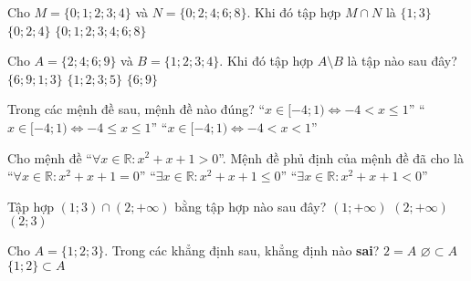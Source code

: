 \begin{ex}%
	Cho $M=\lbrace 0;1;2;3;4 \rbrace$ và $N= \lbrace 0;2;4;6;8 \rbrace$. Khi đó tập hợp $M \cap N$ là
	{$\lbrace 1;3  \rbrace$}
	{\True $ \lbrace 0;2;4  \rbrace$}
	{$\lbrace  0;1;2;3;4;6;8 \rbrace $}
\end{ex}

\begin{ex}%
	Cho $A= \lbrace 2;4;6;9 \rbrace$ và $B= \lbrace 1;2;3;4 \rbrace$. Khi đó tập hợp $A \setminus B$ là tập nào sau đây?
	\choice{$\varnothing $}
	{$ \lbrace 6;9;1;3 \rbrace $}
	{$\lbrace 1;2;3;5 \rbrace $}
	{\True $\lbrace 6;9 \rbrace $}
\end{ex}

\begin{ex}%
	Trong các mệnh đề sau, mệnh đề nào đúng?
	\choice{\True ``$x\in [-4;1)\Leftrightarrow -4 \le x <1$''}
	{``$x\in [-4;1)\Leftrightarrow -4 < x \le 1 $''}
	{``$x\in [-4;1)\Leftrightarrow -4 \le x \le 1$''}
	{``$x\in [-4;1)\Leftrightarrow -4 < x <1$''}
	\loigiai{ Ta có ``$x\in [-4;1)\Leftrightarrow -4 \le x <1$''.
	}
\end{ex}

\begin{ex}%
	Cho mệnh đề ``$\forall x \in \mathbb{R} : x^2+x+1>0$''. Mệnh đề phủ định của mệnh đề đã cho là
	{``$\forall x \in \mathbb{R} :x^2+x+1 = 0$''}
	{\True ``$\exists x \in \mathbb{R} :x^2+x+1 \le 0$''}
	{``$\exists x \in \mathbb{R} :x^2+x+1 < 0$''}
\end{ex}
\begin{ex}%
	Tập hợp $(1;3) \cap (2;+\infty )$ bằng tập hợp nào sau đây?
	\choice{$\varnothing $}
	{$(1;+\infty) $}
	{$(2;+\infty ) $}
	{\True $(2;3) $}
\end{ex}
\begin{ex}%
	Cho $A= \lbrace 1;2;3 \rbrace$. Trong các khẳng định sau, khẳng định nào {\bf sai}?
	{\True $2=A $}
	{$\varnothing \subset A $}
	{$ \lbrace 1;2 \rbrace \subset A $}
\end{ex}

